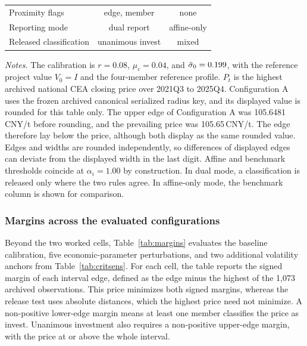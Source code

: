 \begin{table}[!t]
\begin{tabular}{@{}lcccc@{}}
Proximity flags & \multicolumn{2}{c}{edge, member} & \multicolumn{2}{c}{none}\\
Reporting mode & \multicolumn{2}{c}{dual report} & \multicolumn{2}{c}{affine-only}\\
Released classification & \multicolumn{2}{c}{unanimous invest} & \multicolumn{2}{c}{mixed}\\
\bottomrule
\end{tabular}
\par\smallskip
\parbox{0.95\textwidth}{\footnotesize\emph{Notes.} The calibration is $r=0.08$, $\mu_c=0.04$, and $\bar{\sigma}_0=0.199$, with the reference project value $V_0=I$ and the four-member reference profile. $P_t$ is the highest archived national CEA closing price over 2021Q3 to 2025Q4. Configuration A uses the frozen archived canonical serialized radius key, and its displayed value is rounded for this table only. The upper edge of Configuration A was 105.6481\,CNY/t before rounding, and the prevailing price was 105.65\,CNY/t. The edge therefore lay below the price, although both display as the same rounded value. Edges and widths are rounded independently, so differences of displayed edges can deviate from the displayed width in the last digit. Affine and benchmark thresholds coincide at $\alpha_i=1.00$ by construction. In dual mode, a classification is released only where the two rules agree. In affine-only mode, the benchmark column is shown for comparison.}
\end{table}

\subsubsection{Margins across the evaluated configurations}

Beyond the two worked cells, Table~\ref{tab:margins} evaluates the baseline calibration, five economic-parameter perturbations, and two additional volatility anchors from Table~\ref{tab:critsens}. For each cell, the table reports the signed margin of each interval edge, defined as the edge minus the highest of the 1,073 archived observations. This price minimizes both signed margins, whereas the release test uses absolute distances, which the highest price need not minimize. A non-positive lower-edge margin means at least one member classifies the price as invest. Unanimous investment also requires a non-positive upper-edge margin, with the price at or above the whole interval.

